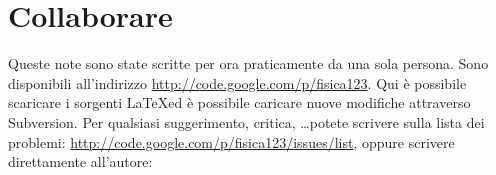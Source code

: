 \section*{\centering Collaborare}
Queste note sono state scritte per ora praticamente da una sola persona. Sono disponibili all'indirizzo \href{http://code.google.com/p/fisica123}{http://code.google.com/p/fisica123}. Qui è possibile scaricare i sorgenti \LaTeX ed è possibile caricare nuove modifiche attraverso Subversion. Per qualsiasi suggerimento, critica, \ldots potete scrivere sulla lista dei problemi: \href{http://code.google.com/p/fisica123/issues/list}{http://code.google.com/p/fisica123/issues/list}, oppure scrivere direttamente all'autore:
\begin{center}
\end{center}
\rmfamily\upshape